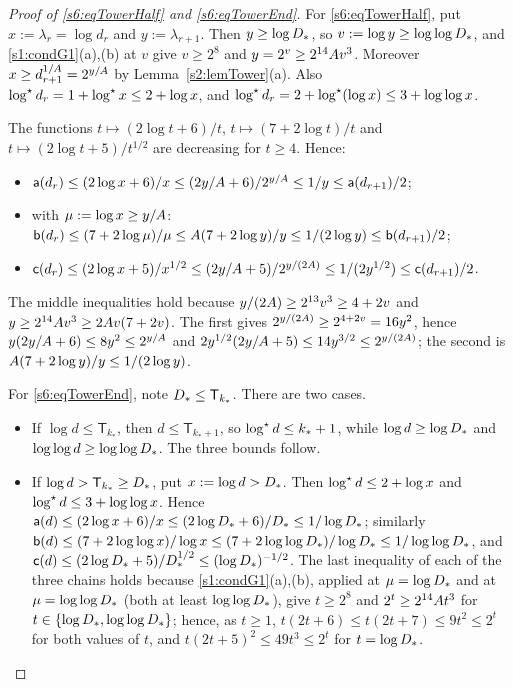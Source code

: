 \begin{proof}[Proof of \eqref{s6:eqTowerHalf} and \eqref{s6:eqTowerEnd}]
For \eqref{s6:eqTowerHalf}, put $x:=\lambda_r=\log d_r$ and $y:=\lambda_{r+1}$. Then $y\ge\log D_{*}$, so $v\mathrel{:=}\log y\ge\log\log D_{*}$, and \ref{s1:condG1}(a),(b) at $v$ give $v\ge2^8$ and $y=2^v\ge2^{14}A v^3$. Moreover $x\ge d_{r+1}^{1/A}=2^{y/A}$ by Lemma~\ref{s2:lemTower}(a). Also $\log^{\star} d_r=1+\log^{\star} x\le2+\log x$, and $\log^{\star} d_r=2+\log^{\star}(\log x)\le3+\log\log x$.

The functions $t\mapsto(2\log t+6)/t$, $t\mapsto(7+2\log t)/t$ and $t\mapsto(2\log t+5)/t^{1/2}$ are decreasing for $t\ge4$. Hence:
\begin{itemize}
\item $\mathsf a(d_r)\le(2\log x+6)/x\le(2y/A+6)/2^{y/A}\le1/y\le\mathsf a(d_{r+1})/2$;
\item with $\mu:=\log x\ge y/A$: $\mathsf b(d_r)\le(7+2\log\mu)/\mu\le A(7+2\log y)/y\le1/(2\log y)\le\mathsf b(d_{r+1})/2$;
\item $\mathsf c(d_r)\le(2\log x+5)/x^{1/2}\le(2y/A+5)/2^{y/(2A)}\le1/(2y^{1/2})\le\mathsf c(d_{r+1})/2$.
\end{itemize}
The middle inequalities hold because $y/(2A)\ge2^{13}v^3\ge4+2v$ and $y\ge2^{14}A v^3\ge2A v(7+2v)$. The first gives $2^{y/(2A)}\ge2^{4+2v}=16y^2$, hence $y(2y/A+6)\le8y^2\le2^{y/A}$ and $2y^{1/2}(2y/A+5)\le14y^{3/2}\le2^{y/(2A)}$; the second is $A(7+2\log y)/y\le1/(2\log y)$.

For \eqref{s6:eqTowerEnd}, note $D_{*}\le\mathsf T_{k_*}$. There are two cases.
\begin{itemize}
\item If $\log d\le\mathsf T_{k_*}$, then $d\le\mathsf T_{k_*+1}$, so $\log^{\star} d\le k_*+1$, while $\log d\ge\log D_{*}$ and $\log\log d\ge\log\log D_{*}$. The three bounds follow.
\item If $\log d>\mathsf T_{k_*}\ge D_{*}$, put $x:=\log d>D_{*}$. Then $\log^{\star} d\le2+\log x$ and $\log^{\star} d\le3+\log\log x$. Hence $\mathsf a(d)\le(2\log x+6)/x\le(2\log D_{*}+6)/D_{*}\le1/\log D_{*}$; similarly $\mathsf b(d)\le(7+2\log\log x)/\log x\le(7+2\log\log D_{*})/\log D_{*}\le1/\log\log D_{*}$, and $\mathsf c(d)\le(2\log D_{*}+5)/D_{*}^{1/2}\le(\log D_{*})^{-1/2}$. The last inequality of each of the three chains holds because \ref{s1:condG1}(a),(b), applied at $\mu=\log D_{*}$ and at $\mu=\log\log D_{*}$ (both at least $\log\log D_{*}$), give $t\ge2^8$ and $2^t\ge2^{14}A t^3$ for $t\in\{\log D_{*},\log\log D_{*}\}$; hence, as $t\ge1$, $t(2t+6)\le t(2t+7)\le9t^2\le2^t$ for both values of $t$, and $t(2t+5)^2\le49t^3\le2^t$ for $t=\log D_{*}$.\qedhere
\end{itemize}
\end{proof}


